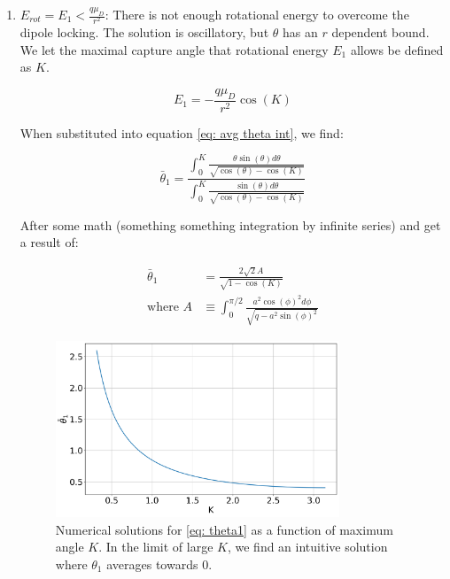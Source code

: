 \begin{enumerate}
	\item $E_{rot} = E_1 < \frac{q \mu_D}{r^2}$:
	There is not enough rotational energy to overcome the dipole locking. The solution is oscillatory, but $\theta$ has an $r$ dependent bound. We let the maximal capture angle that rotational energy $E_1$ allows be defined as $K$.

	\begin{equation*}
		E_1=-\frac{q \mu_D}{r^2}\cos(K)
	\end{equation*}

	When substituted into equation \ref{eq: avg theta int}, we find:

	\begin{equation}
	    \bar{\theta}_1 = \frac{\int_0^K \frac{\theta \sin(\theta) d \theta}{\sqrt{\cos(\theta) - \cos(K)}}}{\int_0^K \frac{\sin(\theta) d \theta}{\sqrt{\cos(\theta) - \cos(K)}}} \label{eq: theta1}
	\end{equation}

	After some math (something something integration by infinite series) and get a result of:

	\begin{align*}
	    \bar{\theta}_1 & = \frac{2 \sqrt{2}A}{\sqrt{1-\cos(K)}} \\
	    \text{where }A & \equiv \int_0^{\pi/2} \frac{a^2 \cos(\phi)^2 d\phi}{\sqrt{q-a^2 \sin(\phi)^2}}
	\end{align*}

	\begin{figure}[H]
		\label{fig: theta1}
		\centering
		\includegraphics[width=0.8\textwidth]{images/ADO_theta1.png}
		\caption{Numerical solutions for \cref{eq: theta1} as a function of maximum angle $K$. In the limit of large $K$, we find an intuitive solution where $\theta_1$ averages towards 0.}
	\end{figure}


\end{enumerate}

